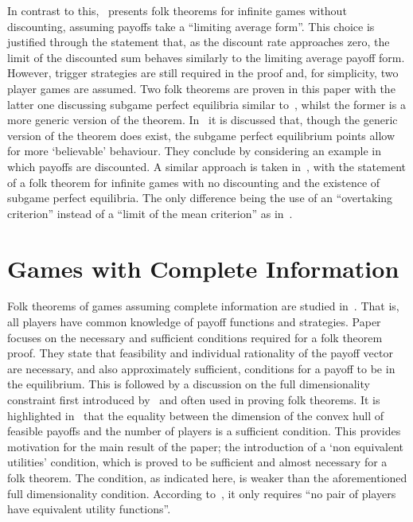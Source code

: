 In contrast to this,~\cite{aumann1976long} presents folk theorems for infinite
games without discounting, assuming payoffs take a ``limiting average form''.
This choice is justified through the statement that, as the discount rate
approaches zero, the limit of the discounted sum behaves similarly to the
limiting average payoff
form. However, trigger strategies are still required in the proof and, for
simplicity, two player games are assumed. Two folk theorems are
proven in this paper with the latter one discussing subgame perfect equilibria
similar to~\cite{Friedman1971}, whilst the former is a more generic version of
the theorem. In~\cite{aumann1976long} it is discussed that, though the generic version of
the theorem does exist, the subgame perfect equilibrium points allow for more
`believable' behaviour. They conclude by considering an example in which payoffs
are discounted. A similar approach is taken in~\cite{Rubinstein1979}, with the
statement of a folk theorem for infinite games with no discounting and the
existence of subgame perfect equilibria. The only difference being the use of an
``overtaking criterion'' instead of a ``limit of the mean
criterion'' as in~\cite{aumann1976long}.


\section{Games with Complete Information}\label{sec:Games_with_Complete_Information}
Folk theorems of games assuming complete information are studied
in~\cite{Abreu1994, Bernergard2019}. That is, all players have common knowledge
of payoff functions and strategies. Paper~\cite{Abreu1994} focuses on the
necessary and sufficient conditions required for a folk theorem proof. They
state that feasibility and individual rationality of the payoff vector are
necessary, and also approximately sufficient, conditions for a payoff to be in
the equilibrium. This is followed by a discussion on the full dimensionality
constraint first introduced by~\cite{Fudenberg1986} and often used in proving
folk theorems. It is highlighted in~\cite{Abreu1994} that the equality between
the dimension of the convex hull of feasible payoffs and the number
of players is a sufficient condition. This provides motivation for the main result of the paper; the
introduction of a `non equivalent utilities' condition, which is proved to be
sufficient and almost necessary for a folk theorem. The condition, as indicated
here, is weaker than the aforementioned full dimensionality condition. According
to~\cite{Abreu1994}, it only requires ``no pair of players have equivalent utility functions''.

